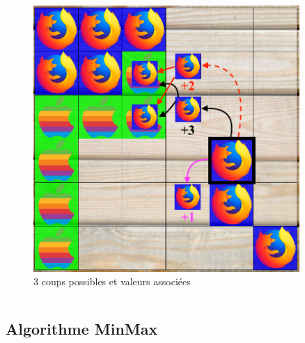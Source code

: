 \documentclass[9pt]{beamer}
\begin{document}
\begin{frame}[fragile]
\begin{columns}
\begin{column}{7cm}
\begin{figure}[h]
        \begin{center}
            \includegraphics[width=0.9\textwidth]{figures/truc.png}
            \caption{3 coups possibles et valeurs associées}
        \end{center}
    \end{figure}
\end{column}

\end{columns}

\end{frame}

\subsection{Algorithme MinMax}
\end{document}
